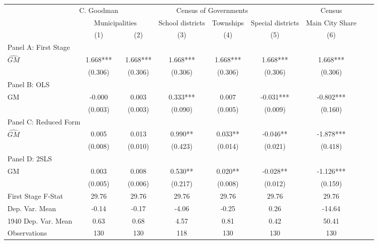  \begin{tabular}{l*{8}{c}} \toprule
&\multicolumn{1}{c}{C. Goodman}&\multicolumn{4}{c}{Census of Governments}&\multicolumn{1}{c}{Census}\\\cmidrule(lr){2-2}\cmidrule(lr){3-6}\cmidrule(lr){7-7}
&\multicolumn{2}{c}{Municipalities}&\multicolumn{1}{c}{School districts}&\multicolumn{1}{c}{Townships}&\multicolumn{1}{c}{Special districts}&\multicolumn{1}{c}{Main City Share}\\\cmidrule(lr){2-3}\cmidrule(lr){4-6}\cmidrule(lr){7-7}
&\multicolumn{1}{c}{(1)}&\multicolumn{1}{c}{(2)}&\multicolumn{1}{c}{(3)}&\multicolumn{1}{c}{(4)}&\multicolumn{1}{c}{(5)}&\multicolumn{1}{c}{(6)}\\
\cmidrule(lr){1-7}
\multicolumn{6}{l}{Panel A: First Stage}\\
\cmidrule(lr){1-7}
$\widehat{GM}$  &    1.668***&    1.668***&    1.668***&    1.668***&    1.668***&    1.668***\\
                &  (0.306)   &  (0.306)   &  (0.306)   &  (0.306)   &  (0.306)   &  (0.306)   \\
\cmidrule(lr){1-7}
\multicolumn{6}{l}{Panel B: OLS}\\
\cmidrule(lr){1-7}
GM              &   -0.000   &    0.003   &    0.333***&    0.007   &   -0.031***&   -0.802***\\
                &  (0.003)   &  (0.003)   &  (0.090)   &  (0.005)   &  (0.009)   &  (0.160)   \\
\cmidrule(lr){1-7}
\multicolumn{6}{l}{Panel C: Reduced Form}\\
\cmidrule(lr){1-7}
$\widehat{GM}$  &    0.005   &    0.013   &    0.990** &    0.033** &   -0.046** &   -1.878***\\
                &  (0.008)   &  (0.010)   &  (0.423)   &  (0.014)   &  (0.021)   &  (0.418)   \\
\cmidrule(lr){1-7}
\multicolumn{6}{l}{Panel D: 2SLS}\\
\cmidrule(lr){1-7}
GM              &    0.003   &    0.008   &    0.530** &    0.020** &   -0.028** &   -1.126***\\
                &  (0.005)   &  (0.006)   &  (0.217)   &  (0.008)   &  (0.012)   &  (0.159)   \\
\midrule
First Stage F-Stat&    29.76   &    29.76   &    29.76   &    29.76   &    29.76   &    29.76   \\
Dep. Var. Mean  &    -0.14   &    -0.17   &    -4.06   &    -0.25   &     0.26   &   -14.64   \\
1940 Dep. Var. Mean&     0.63   &     0.68   &     4.57   &     0.81   &     0.42   &    50.41   \\
Observations    &      130   &      130   &      118   &      130   &      130   &      130   \\
       \bottomrule \end{tabular}
